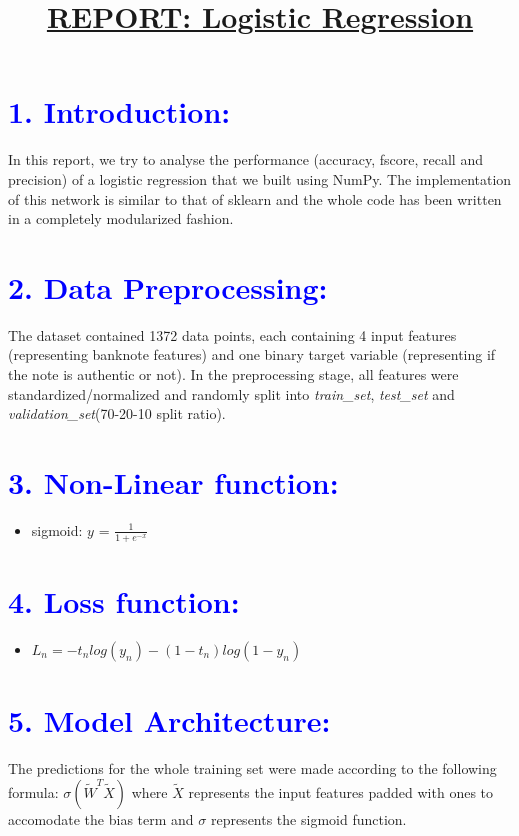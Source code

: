\documentclass[a4paper,10pt,twocolumn]{article}
\title{\textbf{\underline{REPORT: Logistic Regression}}}
\date{}
\author{}
\begin{document}
\maketitle
\section*{\textcolor{blue}{1. Introduction:}}
In this report, we try to analyse the performance (accuracy, fscore, recall and precision) of a logistic regression that we built using NumPy. The implementation of this network is similar to that of sklearn and the whole code has been written in a completely modularized fashion.

\section*{\textcolor{blue}{2. Data Preprocessing:}}
The dataset contained 1372 data points, each containing 4 input features (representing banknote features) and one binary target variable (representing if the note is authentic or not). In the preprocessing stage, all features were standardized/normalized and randomly split into \textit{train\_set}, \textit{test\_set} and \textit{validation\_set}(70-20-10 split ratio).

\section*{\textcolor{blue}{3. Non-Linear function:}}
\begin{itemize}
\item{sigmoid: $y$ = $\frac{1}{1 + e^{-x}}$}
\end{itemize}

\section*{\textcolor{blue}{4. Loss function:}}
\begin{itemize}
\item{$L_n = -t_nlog(y_n)-(1-t_n)log(1-y_n)$} 
\end{itemize}

\section*{\textcolor{blue}{5. Model Architecture:}}
The predictions for the whole training set were made according to the following formula: $\sigma(\widetilde{W}^T \widetilde{X})$ where $\widetilde{X}$ represents the input features padded with ones to accomodate the bias term and $\sigma$ represents the sigmoid function.
\end{document}
